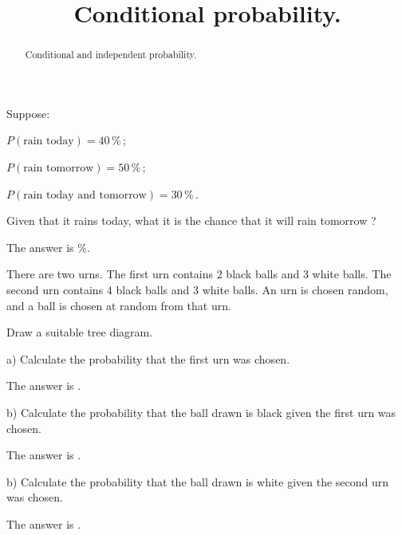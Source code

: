 \documentclass{ximera}
\title{Conditional probability.}
\begin{document}
\begin{abstract}
Conditional and independent probability.
\end{abstract}
\maketitle

\begin{question}
Suppose:

$P(\text{rain today})=40\,\%\,$; 

$P(\text{rain tomorrow})=50\,\%\,$; 

$P(\text{rain today and tomorrow})=30\,\%\,$.

Given that it rains today, what it is the chance that it will rain tomorrow ?
     \begin{solution}
           The answer is  $\%$.
     \end{solution}
\end{question}

There are two urns. The first urn contains $2$ black balls and $3$ white balls. The second urn contains $4$ black balls and $3$ white balls. An urn is chosen random, and a ball is chosen at random from that urn.
     \begin{hint}
          Draw a suitable tree diagram.
     \end{hint}

\begin{question}
a) Calculate the probability that the first urn was chosen.
     \begin{solution}
           The answer is .
     \end{solution}
\end{question}

\begin{question}
b) Calculate the probability that the ball drawn is black given the first urn was chosen.
     \begin{solution}
           The answer is .
     \end{solution}
\end{question}

\begin{question}
b) Calculate the probability that the ball drawn is white given the second urn was chosen.
     \begin{solution}
           The answer is .
     \end{solution}
\end{question}
\end{document}
